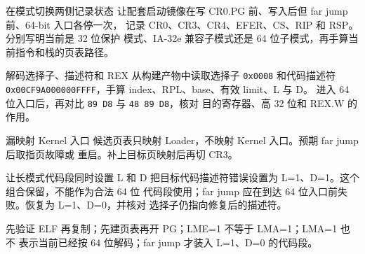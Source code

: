 
\begin{experimentbox}{在模式切换两侧记录状态}
让配套启动镜像在写 CR0.PG 前、写入后但 far jump 前、64-bit 入口各停一次，
记录 CR0、CR3、CR4、EFER、CS、RIP 和 RSP。分别写明当前是 32 位保护
模式、IA-32e 兼容子模式还是 64 位子模式，再手算当前指令和栈的页表路径。
\end{experimentbox}

\begin{experimentbox}{解码选择子、描述符和 REX}
从构建产物中读取选择子 \texttt{0x0008} 和代码描述符
\texttt{0x00CF9A000000FFFF}，手算 index、RPL、base、有效 limit、L 与 D。
进入 64 位入口后，再对比 \texttt{89 D8} 与 \texttt{48 89 D8}，核对
目的寄存器、高 32 位和 REX.W 的作用。
\end{experimentbox}

\begin{faultinjectionbox}{漏映射 Kernel 入口}
候选页表只映射 Loader，不映射 Kernel 入口。预期 far jump 后取指页故障或
重启。补上目标页映射后再切 CR3。
\end{faultinjectionbox}

\begin{faultinjectionbox}{让长模式代码段同时设置 L 和 D}
把目标代码描述符错误设置为 L=1、D=1。这个组合保留，不能作为合法 64 位
代码段使用；far jump 应在到达 64 位入口前失败。恢复为 L=1、D=0，并核对
选择子仍指向修复后的描述符。
\end{faultinjectionbox}

\begin{pitfallbox}
先验证 ELF 再复制；先建页表再开 PG；LME=1 不等于 LMA=1；LMA=1 也不
表示当前已经按 64 位解码；far jump 才装入 L=1、D=0 的代码段。
\end{pitfallbox}

